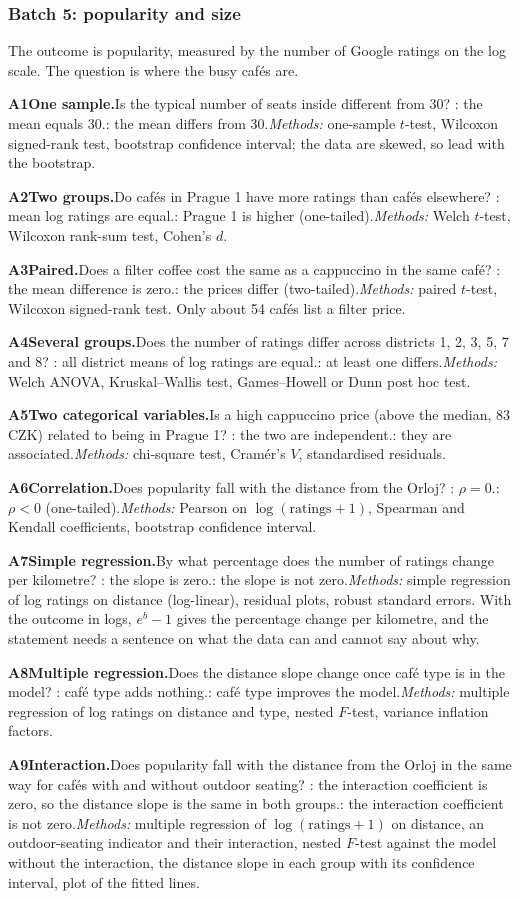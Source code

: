 \documentclass[11pt,a4paper]{article}
\newcommand{\analysis}[6]{%
  \par\smallskip\noindent\textbf{A#1\enspace #2.}\enspace #3\enspace
  \Ho: #4\enspace \Hone: #5\enspace \textit{Methods:} #6\par}
\begin{document}
\clearpage
\subsubsection{Batch 5: popularity and size}

The outcome is popularity, measured by the number of Google ratings on the log scale. The question is where the busy caf\'es are.

\analysis{1}{One sample}{Is the typical number of seats inside different from 30?}{the mean equals 30.}{the mean differs from 30.}{one-sample $t$-test, Wilcoxon signed-rank test, bootstrap confidence interval; the data are skewed, so lead with the bootstrap.}
\analysis{2}{Two groups}{Do caf\'es in Prague 1 have more ratings than caf\'es elsewhere?}{mean log ratings are equal.}{Prague 1 is higher (one-tailed).}{Welch $t$-test, Wilcoxon rank-sum test, Cohen's $d$.}
\analysis{3}{Paired}{Does a filter coffee cost the same as a cappuccino in the same caf\'e?}{the mean difference is zero.}{the prices differ (two-tailed).}{paired $t$-test, Wilcoxon signed-rank test. Only about 54 caf\'es list a filter price.}
\analysis{4}{Several groups}{Does the number of ratings differ across districts 1, 2, 3, 5, 7 and 8?}{all district means of log ratings are equal.}{at least one differs.}{Welch ANOVA, Kruskal--Wallis test, Games--Howell or Dunn post hoc test.}
\analysis{5}{Two categorical variables}{Is a high cappuccino price (above the median, 83 CZK) related to being in Prague 1?}{the two are independent.}{they are associated.}{chi-square test, Cram\'er's $V$, standardised residuals.}
\analysis{6}{Correlation}{Does popularity fall with the distance from the Orloj?}{$\rho=0$.}{$\rho<0$ (one-tailed).}{Pearson on $\log(\text{ratings}+1)$, Spearman and Kendall coefficients, bootstrap confidence interval.}
\analysis{7}{Simple regression}{By what percentage does the number of ratings change per kilometre?}{the slope is zero.}{the slope is not zero.}{simple regression of log ratings on distance (log-linear), residual plots, robust standard errors. With the outcome in logs, $e^{b}-1$ gives the percentage change per kilometre, and the statement needs a sentence on what the data can and cannot say about why.}
\analysis{8}{Multiple regression}{Does the distance slope change once caf\'e type is in the model?}{caf\'e type adds nothing.}{caf\'e type improves the model.}{multiple regression of log ratings on distance and type, nested $F$-test, variance inflation factors.}
\analysis{9}{Interaction}{Does popularity fall with the distance from the Orloj in the same way for caf\'es with and without outdoor seating?}{the interaction coefficient is zero, so the distance slope is the same in both groups.}{the interaction coefficient is not zero.}{multiple regression of $\log(\text{ratings}+1)$ on distance, an outdoor-seating indicator and their interaction, nested $F$-test against the model without the interaction, the distance slope in each group with its confidence interval, plot of the fitted lines.}
\end{document}
